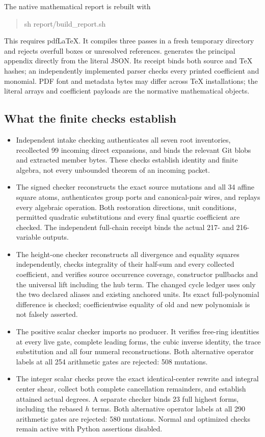 The native mathematical report is rebuilt with
\begin{quote}\ttfamily
sh report/build\_report.sh
\end{quote}
This requires pdfLaTeX. It compiles three passes in a fresh temporary
directory and rejects overfull boxes or unresolved references.
 generates the principal appendix
directly from the literal JSON. Its receipt binds both source and TeX
hashes; an independently implemented parser checks every printed
coefficient and monomial. PDF font and metadata bytes may differ across
TeX installations; the literal arrays and coefficient payloads are the
normative mathematical objects.

\subsection{What the finite checks establish}
\begin{itemize}
\item Independent intake checking authenticates all seven root inventories,
recollected 99 incoming direct expansions, and binds the relevant Git
blobs and extracted member bytes. These checks establish identity and
finite algebra, not every unbounded theorem of an incoming packet.
\item The signed checker reconstructs the exact source mutations and all
34 affine square atoms, authenticates group ports and canonical-pair
wires, and replays every algebraic operation. Both restoration directions,
unit conditions, permitted quadratic substitutions and every final
quartic coefficient are checked. The independent full-chain receipt
binds the actual 217- and 216-variable outputs.
\item The height-one checker reconstructs all divergence and equality
squares independently, checks integrality of their half-sum and every
collected coefficient, and verifies source occurrence coverage,
constructor pullbacks and the universal lift including the hub term.
The changed cycle ledger uses only the two declared aliases and existing
anchored units. Its exact full-polynomial difference is checked;
coefficientwise equality of old and new polynomials is not falsely
asserted.
\item The positive scalar checker imports no producer. It verifies
free-ring identities at every live gate, complete leading forms,
the cubic inverse identity, the trace substitution and all four
numeral reconstructions. Both alternative operator labels at all
254 arithmetic gates are rejected: 508 mutations.
\item The integer scalar checks prove the exact identical-center
rewrite and integral center shear, collect both complete cancellation
remainders, and establish attained actual degrees. A separate checker
binds 23 full highest forms, including the rebased $h$ terms.
Both alternative operator labels at all 290 arithmetic gates are
rejected: 580 mutations. Normal and optimized checks remain active
with Python assertions disabled.
\end{itemize}

